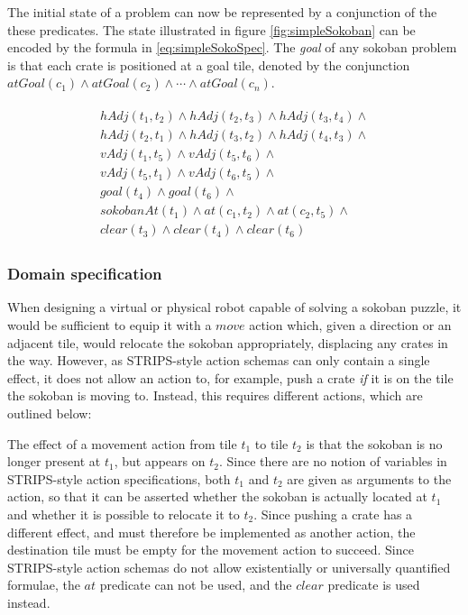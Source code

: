 \documentclass[../Master.tex]{subfiles}
\begin{document}
The initial state of a problem can now be represented by a conjunction of the these predicates. The state illustrated in figure \ref{fig:simpleSokoban} can be encoded by the formula in \eqref{eq:simpleSokoSpec}. The \textit{goal} of any sokoban problem is that each crate is positioned at a goal tile, denoted by the conjunction $atGoal(c_1) \land atGoal(c_2) \land \cdots \land atGoal(c_n)$.

\begin{gather}
\begin{gathered} \label{eq:simpleSokoSpec}
    hAdj(t_1, t_2) \land hAdj(t_2, t_3) \land hAdj(t_3, t_4) \land \\
    hAdj(t_2, t_1) \land hAdj(t_3, t_2) \land hAdj(t_4, t_3) \land \\
    vAdj(t_1, t_5) \land vAdj(t_5, t_6) \land \\
    vAdj(t_5, t_1) \land vAdj(t_6, t_5) \land \\
    goal(t_4) \land goal(t_6) \land \\
    sokobanAt(t_1) \land at(c_1, t_2) \land at(c_2, t_5) \land \\
    clear(t_3) \land clear(t_4) \land clear(t_6)
\end{gathered}
\end{gather}


\graphicspath{{.../Graphics/}}

\subsubsection*{Domain specification}
When designing a virtual or physical robot capable of solving a sokoban puzzle, it would be sufficient to equip it with a $move$ action which, given a direction or an adjacent tile, would relocate the sokoban appropriately, displacing any crates in the way. However, as STRIPS-style action schemas can only contain a single effect, it does not allow an action to, for example, push a crate \textit{if}  it is on the tile the sokoban is moving to. Instead, this requires different actions, which are outlined below:

The effect of a movement action from tile $t_1$ to tile $t_2$ is that the sokoban is no longer present at $t_1$, but appears on $t_2$. Since there are no notion of variables in STRIPS-style action specifications, both $t_1$ and $t_2$ are given as arguments to the action, so that it can be asserted whether the sokoban is actually located at $t_1$ and whether it is possible to relocate it to $t_2$. Since pushing a crate has a different effect, and must therefore be implemented as another action, the destination tile must be empty for the movement action to succeed. Since STRIPS-style action schemas do not allow existentially or universally quantified formulae, the $at$ predicate can not be used, and the $clear$ predicate is used instead.
\end{document}
